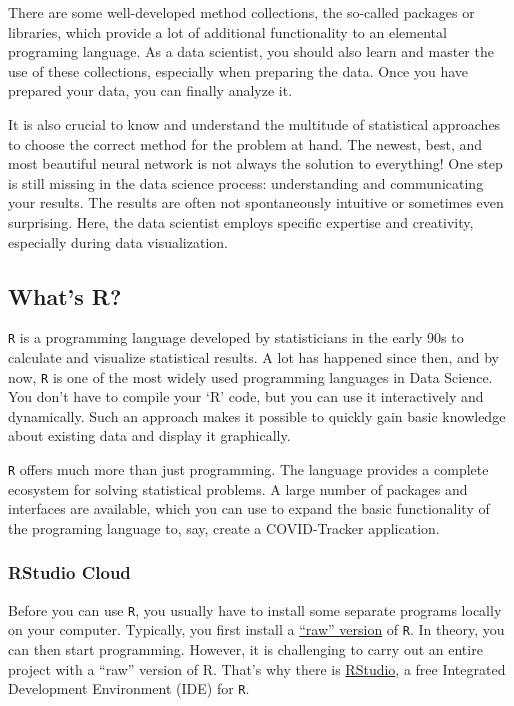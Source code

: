 \documentclass[
  11pt,
]{article}
\begin{document}
There are some well-developed method collections, the so-called packages or libraries, which provide a lot of additional functionality to an elemental programing language.
As a data scientist, you should also learn and master the use of these collections, especially when preparing the data.
Once you have prepared your data, you can finally analyze it.

It is also crucial to know and understand the multitude of statistical approaches to choose the correct method for the problem at hand.
The newest, best, and most beautiful neural network is not always the solution to everything!
One step is still missing in the data science process: understanding and communicating your results.
The results are often not spontaneously intuitive or sometimes even surprising.
Here, the data scientist employs specific expertise and creativity, especially during data visualization.

\hypertarget{whats-r}{%
\subsection{What's R?}\label{whats-r}}

\texttt{R} is a programming language developed by statisticians in the early 90s to calculate and visualize statistical results.
A lot has happened since then, and by now, \texttt{R} is one of the most widely used programming languages in Data Science.
You don't have to compile your `R' code, but you can use it interactively and dynamically.
Such an approach makes it possible to quickly gain basic knowledge about existing data and display it graphically.

\texttt{R} offers much more than just programming.
The language provides a complete ecosystem for solving statistical problems.
A large number of packages and interfaces are available, which you can use to expand the basic functionality of the programing language to, say, create a COVID-Tracker application.

\hypertarget{rstudio-cloud}{%
\subsubsection{RStudio Cloud}\label{rstudio-cloud}}

Before you can use \texttt{R}, you usually have to install some separate programs locally on your computer.
Typically, you first install a \href{https://rstudio-education.github.io/hopr/starting.html}{``raw'' version} of \texttt{R}.
In theory, you can then start programming.
However, it is challenging to carry out an entire project with a ``raw'' version of R.
That's why there is \href{https://www.rstudio.com/products/rstudio/download/}{RStudio}, a free Integrated Development Environment (IDE) for \texttt{R}.
\end{document}
